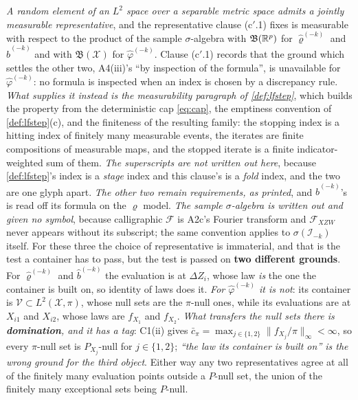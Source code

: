 \emph{A random element of an $L^{2}$ space over a separable metric space admits a jointly measurable
representative}, and the representative clause \textup{(c$'$.1)} fixes is measurable with respect to
the product of the sample $\sigma$-algebra with $\mathfrak B(\mathbb{R}^{p})$ for $\hat\varrho^{(-k)}$ and
$\hat b^{(-k)}$ and with $\mathfrak B(\mathcal X)$ for $\hat\varphi^{(-k)}$.
Clause \textup{(c$'$.1)} records that the ground which settles the other two, A4(iii)'s ``by inspection
of the formula'', is unavailable for $\hat\varphi^{(-k)}$: no formula is inspected when an index is
chosen by a
discrepancy rule. \emph{What supplies it instead is the measurability paragraph of \cref{def:lfstep}}, which
builds the property from the deterministic cap \eqref{eq:cap}, the emptiness convention of
\cref{def:lfstep}\textup{(c)}, and the finiteness of the resulting family: the stopping index is a hitting
index of finitely many measurable events, the iterates are finite compositions of measurable maps, and the
stopped iterate is a finite indicator-weighted sum of them. \emph{The superscripts are not written out here},
because \cref{def:lfstep}'s index is a \emph{stage} index and this clause's is a \emph{fold} index, and the
two are one glyph apart. \emph{The other two remain requirements, as printed}, and $\hat b^{(-k)}$'s is read
off its formula on the $\hat\varrho$ model.
\emph{The sample $\sigma$-algebra is written out and given no symbol}, because
calligraphic $\mathcal F$ is A2c's Fourier transform and $\mathcal F_{XZW}$ never appears
without its subscript; the same convention applies to $\sigma(\mathcal I_{-k})$
itself.
For these three the choice of representative is immaterial, and that is the test a container has to
pass, but the test is passed on \textbf{two different grounds}. For $\hat\varrho^{(-k)}$ and $\hat b^{(-k)}$ the evaluation is at
$\Delta Z_i$, whose law \emph{is} the one the container is built on, so identity of laws does it. \emph{For
$\hat\varphi^{(-k)}$ it is not}: its container is $\mathcal V\subset L^{2}(\mathcal X,\pi)$, whose null
sets are the $\pi$-null ones, while its evaluations are at $X_{i1}$ and $X_{i2}$, whose laws are $f_{X_1}$
and $f_{X_2}$. \emph{What transfers the null sets there is \textbf{domination}, and it has a tag}: C1(ii)
gives $\bar c_\pi=\max_{j\in\{1,2\}}\|f_{X_j}/\pi\|_\infty<\infty$, so every $\pi$-null set is
$P_{X_j}$-null for $j\in\{1,2\}$; \emph{``the law its container is built on'' is the wrong ground for the
third object}. Either way any two representatives
agree at all of the finitely many evaluation points outside a $P$-null set, the union of the finitely many
exceptional sets being $P$-null.

